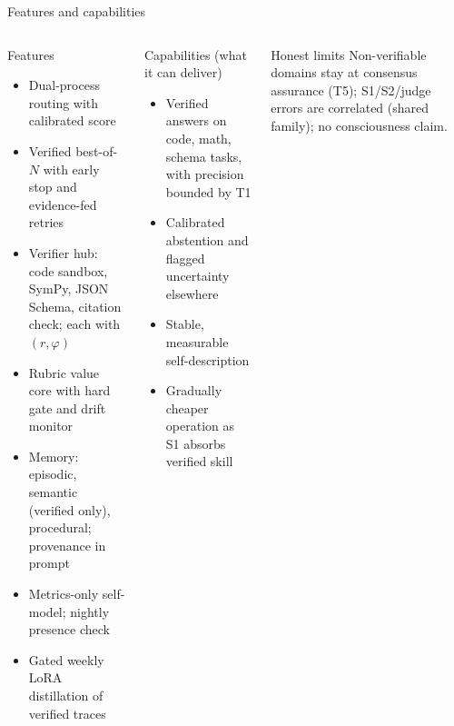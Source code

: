 \documentclass[aspectratio=169,10pt]{beamer}
\begin{document}
\begin{frame}{Features and capabilities}
\begin{columns}[T]
\begin{exampleblock}{Features}
\small
\begin{itemize}\setlength\itemsep{1pt}
\item Dual-process routing with calibrated score
\item Verified best-of-$N$ with early stop and evidence-fed retries
\item Verifier hub: code sandbox, SymPy, JSON Schema, citation check; each with $(r,\varphi)$
\item Rubric value core with hard gate and drift monitor
\item Memory: episodic, semantic (verified only), procedural; provenance in prompt
\item Metrics-only self-model; nightly presence check
\item Gated weekly LoRA distillation of verified traces
\end{itemize}
\end{exampleblock}
\begin{block}{Capabilities (what it can deliver)}
\small
\begin{itemize}\setlength\itemsep{1pt}
\item Verified answers on code, math, schema tasks, with precision bounded by T1
\item Calibrated abstention and flagged uncertainty elsewhere
\item Stable, measurable self-description
\item Gradually cheaper operation as S1 absorbs verified skill
\end{itemize}
\end{block}
\begin{alertblock}{Honest limits}
\small
Non-verifiable domains stay at consensus assurance (T5); S1/S2/judge errors are correlated (shared family); no consciousness claim.
\end{alertblock}
\end{columns}
\end{frame}
\end{document}
